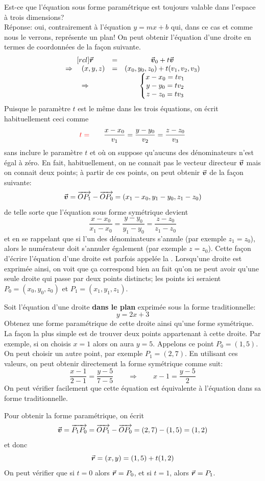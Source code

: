 Est-ce que l'équation sous forme paramétrique est toujours valable dans l'espace à trois dimensions?  \\
Réponse: oui, contrairement à l'équation $y=mx+b$ qui, dans ce cas et comme nous le verrons,
représente un plan!  On peut obtenir l'équation
d'une droite en termes de coordonnées de la façon suivante.
\[
\begin{matrix}[rcl]
\vec{\boldsymbol{r}} &=& \vec{\boldsymbol{v}}_0 + t \vec{\boldsymbol{v}} \\
\Rightarrow\quad (x, y, z) &=& (x_0, y_0, z_0) + t(v_1,v_2, v_3) \\
\Rightarrow && \left\{ \begin{matrix}
x-x_0 = tv_1 \\
y - y_0 = t v_2 \\
z-z_0 = t v_3
\end{matrix}\right.
\end{matrix}
\]
Puisque le paramètre $t$ est le même dans les trois équations, on écrit habituellement ceci
comme
\[
{\color{red}t =}\qquad \frac{x-x_0}{v_1} =\frac{y-y_0}{v_2} =\frac{z-z_0}{v_3}
\]
sans inclure le paramètre $t$ et où on suppose qu'aucuns des dénominateurs n'est égal
à zéro.  
En fait, habituellement, on ne connait pas le vecteur
directeur $\vec{\boldsymbol{v}}$ mais on connait deux points; à partir de ces points, on
peut obtenir $\vec{\boldsymbol{v}}$ de la façon suivante:
\[
\vec{\boldsymbol{v}} = \overrightarrow{OP_1} - \overrightarrow{OP_0} = (x_1-x_0, y_1-y_0, z_1-z_0)
\]
de telle sorte que l'équation sous forme symétrique devient
\[
\frac{x-x_0}{x_1-x_0} =\frac{y-y_0}{y_1-y_0} =\frac{z-z_0}{z_1-z_0}
\]
et en se rappelant que si l'un des dénominateurs s'annule (par exemple $z_1=z_0$),
alors le numérateur doit s'annuler également (par exemple $z = z_0$).  Cette façon d'écrire
l'équation d'une droite est parfois appelée la . Lorsqu'une droite
est exprimée ainsi, on voit que ça correspond bien
au fait qu'on ne peut avoir qu'une seule droite qui passe par deux points distincts;
les points ici seraient $P_0 =  (x_0, y_0, z_0)$ et $P_1 =  (x_1, y_1, z_1)$.

\begin{exemple}
Soit l'équation d'une droite \textbf{dans le plan} exprimée sous la forme traditionnelle:
\[
y = 2x + 3
\]
Obtenez une forme paramétrique de cette droite ainsi qu'une forme symétrique.
\solution
La façon la plus simple est de trouver deux points appartenant à cette droite.
Par exemple, si on choisis $x=1$ alors on aura $y=5$.  Appelons ce point $P_0 = (1,5)$.
On peut choisir un autre point, par exemple $P_1 = (2,7)$.  En utilisant ces valeurs,
on peut obtenir directement la forme symétrique comme suit:
\[
\frac{x-1}{2-1} = \frac{y-5}{7-5} \qquad \Rightarrow \qquad x-1 = \frac{y-5}{2}
\]
On peut vérifier facilement que cette équation est équivalente à l'équation dans sa forme traditionnelle.

Pour obtenir la forme paramétrique, on écrit 
\[
\vec{\boldsymbol{v}} =\overrightarrow{P_1P_0} = \overrightarrow{OP_1} - \overrightarrow{OP_0} = (2,7) - (1,5) = (1,2)
\]
et donc
\[
\vec{\boldsymbol{r}} = (x,y) = (1,5) + t (1,2)
\]
On peut vérifier que si $t=0$ alors $\vec{\boldsymbol{r}} = P_0$, et si $t=1$, alors $\vec{\boldsymbol{r}} = P_1$.
\end{exemple}

